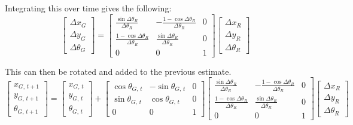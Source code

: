 \documentclass{article}
\begin{document}
Integrating this over time gives the following:
$$
\begin{bmatrix}
    \Delta x_G \\
    \Delta y_G \\
    \Delta \theta_G
\end{bmatrix}
=
\begin{bmatrix}
    \frac{\operatorname{sin} \Delta \theta_R}{\Delta \theta_R} & -\frac{1 - \operatorname{cos} \Delta \theta_R}{\Delta \theta_R} & 0 \\[4pt]
    \frac{1 - \operatorname{cos} \Delta \theta_R}{\Delta \theta_R} & \frac{\operatorname{sin} \Delta \theta_R}{\Delta \theta_R} & 0 \\[4pt]
    0 & 0 & 1
\end{bmatrix}
\begin{bmatrix}
    \Delta x_R \\
    \Delta y_R \\
    \Delta \theta_R
\end{bmatrix}
$$

This can then be rotated and added to the previous estimate.
$$
\begin{bmatrix}
    x_{G,\,t+1} \\
    y_{G,\,t+1} \\
    \theta_{G,\,t+1}
\end{bmatrix}
=
\begin{bmatrix}
    x_{G,\,t} \\
    y_{G,\,t} \\
    \theta_{G,\,t}
\end{bmatrix}
+
\begin{bmatrix}
    \operatorname{cos} \theta_{G,\,t} & -\operatorname{sin} \theta_{G,\,t} & 0 \\
    \operatorname{sin} \theta_{G,\,t} & \operatorname{cos} \theta_{G,\,t} & 0 \\
    0 & 0 & 1
\end{bmatrix}
\begin{bmatrix}
    \frac{\operatorname{sin} \Delta \theta_R}{\Delta \theta_R} & -\frac{1 - \operatorname{cos} \Delta \theta_R}{\Delta \theta_R} & 0 \\[4pt]
    \frac{1 - \operatorname{cos} \Delta \theta_R}{\Delta \theta_R} & \frac{\operatorname{sin} \Delta \theta_R}{\Delta \theta_R} & 0 \\[4pt]
    0 & 0 & 1
\end{bmatrix}
\begin{bmatrix}
    \Delta x_R \\
    \Delta y_R \\
    \Delta \theta_R
\end{bmatrix}
$$
\end{document}
